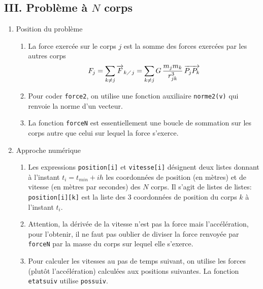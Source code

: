 \subsection*{III. Problème à $N$ corps}
\begin{enumerate}
  \item Position du problème
\begin{enumerate}
  \item La force exercée sur le corps $j$ est la somme des forces exercées par les autres corps
\begin{displaymath}
  F_j = \sum_{k\neq j} \overrightarrow{F}_{k\diagup j}
= \sum_{k\neq j} G\,\frac{m_j m_k}{r_{jk}^3}\, \overrightarrow{P_j P_k}
\end{displaymath}
  \item Pour coder \texttt{force2}, on utilise une fonction auxiliaire \texttt{norme2(v)} qui renvoie la norme d'un vecteur.
  
  
  \item La fonction \texttt{forceN} est essentiellement une boucle de sommation sur les corps autre que celui sur lequel la force s'exerce. 
\end{enumerate}

  \item Approche numérique
\begin{enumerate}
  \item Les expressions \texttt{position[i]} et \texttt{vitesse[i]} désignent deux listes donnant à l'instant $t_i = t_{min}+ih$ les coordonnées de position (en mètres) et de vitesse (en mètres par secondes) des $N$ corps. Il s'agit de listes de listes: \texttt{position[i][k]} est la liste des 3 coordonnées de position du corps $k$ à l'instant $t_i$.
  
  \item Attention, la dérivée de la vitesse n'est pas la force mais l'accélération, pour l'obtenir, il ne faut pas oublier de diviser la force renvoyée par \texttt{forceN} par la masse du corps sur lequel elle s'exerce.
  
  
  \item Pour calculer les vitesses au pas de temps suivant, on utilise les forces (plutôt l'accélération) calculées aux positions suivantes. La fonction \texttt{etat\textunderscore suiv} utilise \texttt{pos\textunderscore suiv}.
  
\end{enumerate}


\end{enumerate}
